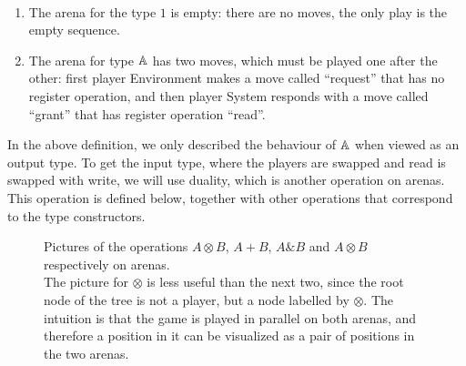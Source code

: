 \documentclass[a4paper,UKenglish,cleveref, autoref, numberwithinsect, thm-restate]{lipics-v2021}
\begin{document}
\begin{definition}\label{def:arenas-without-atoms-or-functions} \ 
    \begin{enumerate}
        \item     The arena for the type $1$ is empty: there are no moves, the only play is the empty sequence. 
        \item The arena for type $\mathbb A$ has two moves, which must be played one after the other: first player Environment makes a move called ``request'' that has no register operation, and then player System responds with  a move called ``grant'' that has register operation ``read''.
    \end{enumerate}
\end{definition}
In the above definition, we only described the behaviour of $\mathbb A$ when viewed as an output type. To get the input type, where the players are swapped and read is swapped with write, we will use duality, which is another operation on arenas. This operation is defined below, together with other operations that correspond to the type constructors.   

\begin{figure}
    \hspace{-0.3cm}\hspace{-1.4cm}
    \hspace{-0.2cm}
    \caption{\label{fig:arena-constructors} Pictures of the operations $A\otimes B$, $A+B$, $A\&B$ and $A\otimes B$ respectively on arenas.\\
    The picture for $\otimes$  is less useful than the next two, since the root node of the tree is not a player, but a node labelled by $\otimes$. The intuition is that the game is played in parallel on both arenas, and therefore a position in it can be visualized as a pair of positions in the two arenas.}
\end{figure}
        
\end{document}
